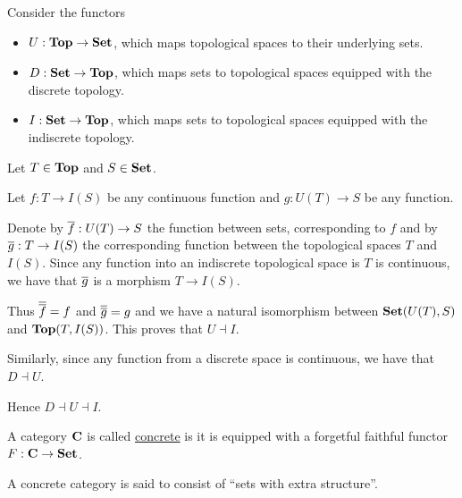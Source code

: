 \begin{example}\label{ex:top_adjoint_functor}\cite[example 2.1.5]{Leinster2014}
  Consider the functors
  \begin{itemize}
    \item $U: \operatorname{\mathbf{Top}} \to \operatorname{\mathbf{Set}}$, which maps topological spaces to their underlying sets.
    \item $D: \operatorname{\mathbf{Set}} \to \operatorname{\mathbf{Top}}$, which maps sets to topological spaces equipped with the discrete topology.
    \item $I: \operatorname{\mathbf{Set}} \to \operatorname{\mathbf{Top}}$, which maps sets to topological spaces equipped with the indiscrete topology.
  \end{itemize}

  Let $T \in \operatorname{\mathbf{Top}}$ and $S \in \operatorname{\mathbf{Set}}$.

  Let $f: T \to I(S)$ be any continuous function and $g: U(T) \to S$ be any function.

  Denote by $\overline{f}: U(T) \to S$ the function between sets, corresponding to $f$ and by $\overline{g}: T \to I(S)$ the corresponding function between the topological spaces $T$ and $I(S)$. Since any function into an indiscrete topological space is $T$ is continuous, we have that $\overline{g}$ is a morphism $T \to I(S)$.

  Thus $\overline{\overline{f}} = f$ and $\overline{\overline{g}} = g$ and we have a natural isomorphism between $\operatorname{\mathbf{Set}}(U(T), S)$ and $\operatorname{\mathbf{Top}}(T, I(S))$. This proves that $U \dashv I$.

  Similarly, since any function from a discrete space is continuous, we have that $D \dashv U$.

  Hence $D \dashv U \dashv I$.
\end{example}

\begin{definition}\label{def:concrete_category}
  A category $\operatorname{\mathbf{C}}$ is called \ul{concrete} is it is equipped with a forgetful faithful functor $F: \operatorname{\mathbf{C}} \to \operatorname{\mathbf{Set}}$.

  A concrete category is said to consist of \enquote{sets with extra structure}.
\end{definition}

